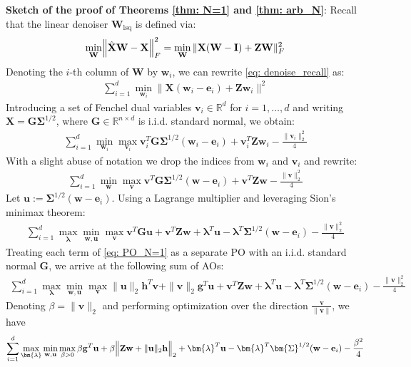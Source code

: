 \documentclass[final]{l4dc2026}
\newcommand{\bSigma}{\bm{\Sigma}}
\newcommand{\blambda}{\bm{\lambda}}
\newcommand{\bG}{\mathbf{G}}
\newcommand{\bI}{\mathbf{I}}
\newcommand{\bW}{\mathbf{W}}
\newcommand{\bX}{\mathbf{X}}
\newcommand{\bZ}{\mathbf{Z}}
\newcommand{\be}{\mathbf{e}}
\newcommand{\bg}{\mathbf{g}}
\newcommand{\bh}{\mathbf{h}}
\newcommand{\bu}{\mathbf{u}}
\newcommand{\bv}{\mathbf{v}}
\newcommand{\bw}{\mathbf{w}}
\newcommand{\hbX}{\hat{\mathbf{X}}}
\newcommand{\bbR}{\mathbb{R}}
\begin{document}
\textbf{Sketch of the proof of Theorems \ref{thm: N=1} and \ref{thm: arb_N}}: Recall that the linear denoiser $\bW_{\text{lsq}}$ is defined via:
\begin{align}\label{eq: denoise_recall}
     \min_\bW \Bigl\|
        \hbX \bW - 
        \bX
    \Bigr\|_F^2 = \min_{\bW} \|\bX (\bW - \bI) + \bZ \bW \|_F^2
\end{align}
Denoting the $i$-th column of $\bW$ by $\bw_i$, we can rewrite \eqref{eq: denoise_recall} as:
\begin{align}
    \sum_{i=1}^d  \min_{\bw_i} \|\bX (\bw_i - \be_i) + \bZ \bw_i \|^2
\end{align}
Introducing a set of Fenchel dual variables $\bv_i \in \bbR^d$ for $i=1,\dots,d$ and writing $\bX = \bG \bSigma^{1/2}$, where $\bG \in \bbR^{n\times d}$ is i.i.d. standard normal, we obtain:
\begin{align*}
    \sum_{i=1}^d \min_{\bw_i} \max_{\bv_i}  \bv_i^T \bG \bSigma^{1/2} (\bw_i - \be_i) + \bv_i^T \bZ \bw_i - \frac{\|\bv_i\|_2^2}{4}
\end{align*}
With a slight abuse of notation we drop the indices from $\bw_i$ and $\bv_i$ and rewrite:
\begin{align*}
    \sum_{i=1}^d \min_{\bw} \max_{\bv}  \bv^T \bG \bSigma^{1/2} (\bw - \be_i) + \bv^T \bZ \bw - \frac{\|\bv\|_2^2}{4}
\end{align*}
Let $\bu:= \bSigma^{1/2} (\bw - \be_i)$. Using a Lagrange multiplier and leveraging Sion's minimax theorem:
\begin{align}\label{eq: PO_N=1}
     \sum_{i=1}^d \max_{\blambda} \min_{\bw,\bu} \max_{\bv}  \bv^T \bG \bu + \bv^T \bZ \bw + \blambda^T \bu - \blambda ^T \bSigma^{1/2} (\bw - \be_i)  - \frac{\|\bv\|_2^2}{4}
\end{align}
Treating each term of \eqref{eq: PO_N=1} as a separate PO with an i.i.d. standard normal $\bG$, we arrive at the following sum of AOs:
\begin{align*}
     \sum_{i=1}^d\max_{\blambda} \min_{\bw, \bu} \max_{\bv}  \|\bu\|_2 \bh^T \bv + \|\bv\|_2 \bg^T\bu  + \bv^T \bZ \bw + \blambda^T \bu - \blambda ^T \bSigma^{1/2} (\bw - \be_i)  - \frac{\|\bv\|_2^2}{4}
\end{align*}
Denoting $\beta = \|\bv\|_2$ and performing optimization over the direction $\frac{\bv}{\|\bv\|}$, we have
\begin{align*} \sum_{i=1}^d 
     \max_{\blambda} \min_{\bw,\bu} \max_{\beta>0}  \beta \bg^T\bu + \beta \Bigl\|\bZ \bw +   \|\bu\|_2 \bh \Bigr\|_2 + \blambda^T \bu - \blambda ^T \bSigma^{1/2} (\bw - \be_i)  - \frac{\beta^2}{4}
\end{align*}
\end{document}
